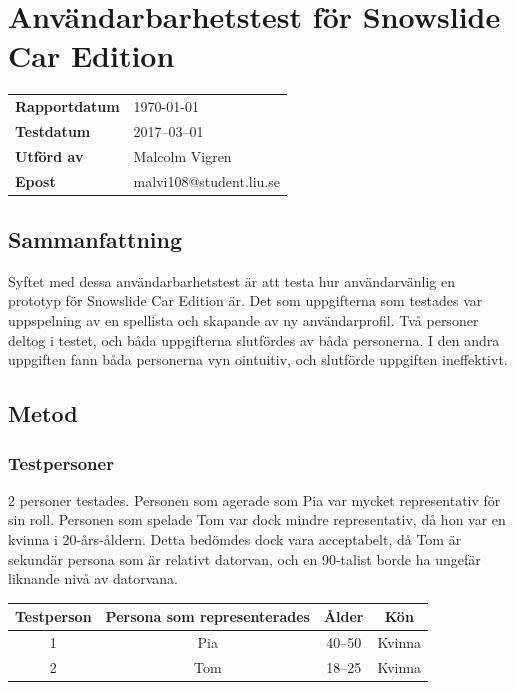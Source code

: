 \documentclass[a4paper,12pt,titlepage]{article}
\begin{document}
\section*{Användarbarhetstest för Snowslide Car Edition}

\renewcommand*{\arraystretch}{1.4}
\begin{longtable}[l]{p{4cm} l}
    \textbf{Rapportdatum}    & \today \\
    \textbf{Testdatum   }    & 2017--03--01 \\
    \textbf{Utförd av   }    & Malcolm Vigren \\
    \textbf{Epost       }    & malvi108@student.liu.se \\
\end{longtable}

\subsection*{Sammanfattning}

Syftet med dessa användarbarhetstest är att testa hur användarvänlig en
prototyp för Snowslide Car Edition är. Det som uppgifterna som testades var
uppspelning av en spellista och skapande av ny användarprofil. Två personer
deltog i testet, och båda uppgifterna slutfördes av båda personerna. I den
andra uppgiften fann båda personerna vyn ointuitiv, och slutförde uppgiften
ineffektivt.

\subsection*{Metod}
\subsubsection*{Testpersoner}

2 personer testades. Personen som agerade som Pia var mycket representativ för
sin roll. Personen som spelade Tom var dock mindre representativ, då hon var en
kvinna i 20-års-åldern. Detta bedömdes dock vara acceptabelt, då Tom är
sekundär persona som är relativt datorvan, och en 90-talist borde ha ungefär
liknande nivå av datorvana.

\begin{longtable}[l]{c c c c}
    \textbf{Testperson} & \textbf{Persona som representerades} & \textbf{Ålder} & \textbf{Kön} \\ \midrule
    1 & Pia & 40--50 & Kvinna \\ \midrule
    2 & Tom & 18--25 & Kvinna \\ \midrule
\end{longtable}
\end{document}
